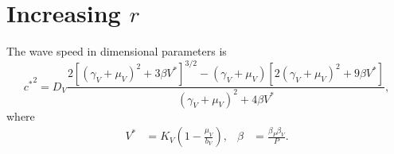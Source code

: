 \documentclass{article}
\newcommand{\mat}[1]{\mathbf{#1}}
\begin{document}



\section{Increasing $r$}

The wave speed in dimensional parameters is
\begin{equation}
  {c^*}^2 = D_V
    \frac{2 \left[(\gamma_V + \mu_V)^2 + 3 \beta V^*\right]^{3/2}
      - (\gamma_V + \mu_V) \left[2 (\gamma_V + \mu_V)^2 + 9 \beta V^*\right]}
    {(\gamma_V + \mu_V)^2 + 4 \beta V^*},
\end{equation}
where
\begin{align}
  V^* &= K_V \left(1 - \frac{\mu_V}{b_V}\right),
  &
  \beta &= \frac{\beta_P \beta_V}{P}.
\end{align}
\end{document}
